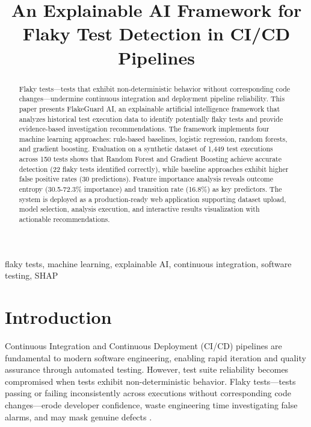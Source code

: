 \documentclass[conference]{IEEEtran}
\begin{document}
\title{An Explainable AI Framework for Flaky Test Detection in CI/CD Pipelines}

\author{
\and
{}
}

\maketitle

\begin{abstract}
Flaky tests—tests that exhibit non-deterministic behavior without corresponding code changes—undermine continuous integration and deployment pipeline reliability. This paper presents FlakeGuard AI, an explainable artificial intelligence framework that analyzes historical test execution data to identify potentially flaky tests and provide evidence-based investigation recommendations. The framework implements four machine learning approaches: rule-based baselines, logistic regression, random forests, and gradient boosting. Evaluation on a synthetic dataset of 1,449 test executions across 150 tests shows that Random Forest and Gradient Boosting achieve accurate detection (22 flaky tests identified correctly), while baseline approaches exhibit higher false positive rates (30 predictions). Feature importance analysis reveals outcome entropy (30.5-72.3\% importance) and transition rate (16.8\%) as key predictors. The system is deployed as a production-ready web application supporting dataset upload, model selection, analysis execution, and interactive results visualization with actionable recommendations.
\end{abstract}

\begin{IEEEkeywords}
flaky tests, machine learning, explainable AI, continuous integration, software testing, SHAP
\end{IEEEkeywords}

\section{Introduction}
Continuous Integration and Continuous Deployment (CI/CD) pipelines are fundamental to modern software engineering, enabling rapid iteration and quality assurance through automated testing. However, test suite reliability becomes compromised when tests exhibit non-deterministic behavior. Flaky tests—tests passing or failing inconsistently across executions without corresponding code changes—erode developer confidence, waste engineering time investigating false alarms, and may mask genuine defects \cite{luo2014empirical}.
\end{document}
